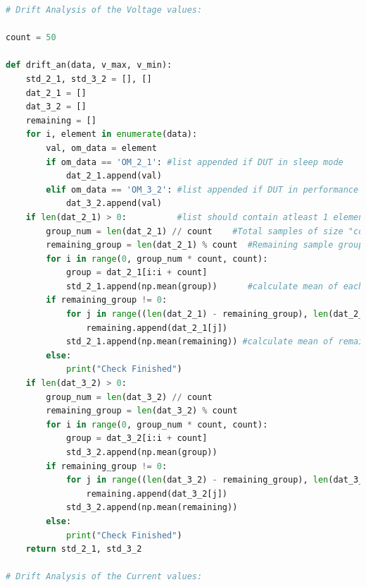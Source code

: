 \begin{lstlisting}[language = Python]
# Drift Analysis of the Voltage values:

count = 50
 
def drift_an(data, v_max, v_min): 
    std_2_1, std_3_2 = [], []
    dat_2_1 = []
    dat_3_2 = []
    remaining = []
    for i, element in enumerate(data):
        val, om_data = element
        if om_data == 'OM_2_1': #list appended if DUT in sleep mode
            dat_2_1.append(val)
        elif om_data == 'OM_3_2': #list appended if DUT in performance mode
            dat_3_2.append(val)
    if len(dat_2_1) > 0:          #list should contain atleast 1 element
        group_num = len(dat_2_1) // count    #Total samples of size "count"
        remaining_group = len(dat_2_1) % count  #Remaining sample group size
        for i in range(0, group_num * count, count):
            group = dat_2_1[i:i + count]
            std_2_1.append(np.mean(group))      #calculate mean of each group
        if remaining_group != 0:
            for j in range((len(dat_2_1) - remaining_group), len(dat_2_1)):
                remaining.append(dat_2_1[j])
            std_2_1.append(np.mean(remaining)) #calculate mean of remaining group
        else:
            print("Check Finished")
    if len(dat_3_2) > 0:
        group_num = len(dat_3_2) // count
        remaining_group = len(dat_3_2) % count
        for i in range(0, group_num * count, count):
            group = dat_3_2[i:i + count]
            std_3_2.append(np.mean(group))
        if remaining_group != 0:
            for j in range((len(dat_3_2) - remaining_group), len(dat_3_2)):
                remaining.append(dat_3_2[j])
            std_3_2.append(np.mean(remaining))
        else:
            print("Check Finished")
    return std_2_1, std_3_2
 
# Drift Analysis of the Current values:
 

\end{lstlisting}

